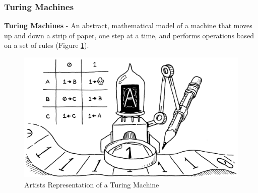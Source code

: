 \documentclass{beamer}
\begin{document}
%
%
\begin{frame}
  \frametitle{Turing Machines}
  \begin{minipage}{0.59\textwidth}
      \textbf{Turing Machines} - An abstract, mathematical model of a machine that moves up and down a strip of paper, one step at a time, and performs operations based on a set of rules (Figure \ref{fig:turingmachine}).
  \end{minipage}
  \begin{minipage}{0.39\textwidth}
    \begin{figure}
      \includegraphics[width=\textwidth]{imgs/turing-machine.png}
      \caption{Artists Representation of a Turing Machine}
      \label{fig:turingmachine}
    \end{figure}
  \end{minipage}
\end{frame}
\end{document}
